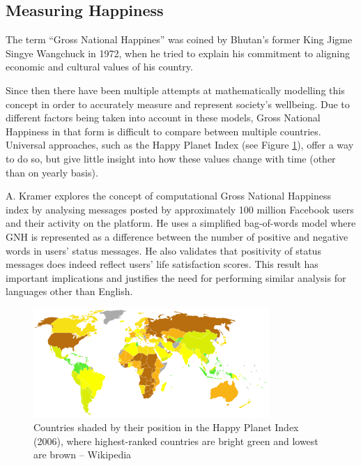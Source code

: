 \subsection{Measuring Happiness}

The term ``Gross National Happines'' was coined by Bhutan's former King Jigme Singye Wangchuck in 1972, when he tried to explain his commitment to aligning economic and cultural values of his country.

Since then there have been multiple attempts at mathematically modelling this concept in order to accurately measure and represent society's wellbeing. Due to different factors being taken into account in these models, Gross National Happiness in that form is difficult to compare between multiple countries. Universal approaches, such as the Happy Planet Index (see Figure \ref{fig:happy-planet}), offer a way to do so, but give little insight into how these values change with time (other than on yearly basis).

A. Kramer \cite{GrossNationalHappiness} explores the concept of computational Gross National Happiness index by analysing messages posted by approximately 100 million Facebook users and their activity on the platform. He uses a simplified bag-of-words model where GNH is represented as a difference between the number of positive and negative words in users' status messages. He also validates that positivity of status messages does indeed reflect users' life satisfaction scores. This result has important implications and justifies the need for performing similar analysis for languages other than English.

\begin{figure}[htb]
  \begin{center}
    \includegraphics[width=0.8\textwidth]{happy-planet.png}
    \caption{Countries shaded by their position in the Happy Planet Index (2006), where highest-ranked countries are bright green and lowest are brown -- Wikipedia}
    \label{fig:happy-planet}
  \end{center}
\end{figure}

